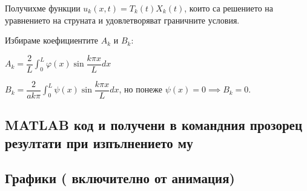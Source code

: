\documentclass[14pt]{extarticle}
\let\frac\dfrac
\begin{document}
Получихме функции $u_k(x,t) = T_k(t)X_k(t)$, които са решението на уравнението на струната и удовлетворяват граничните условия.

Избираме коефициентите $A_k$ и $B_k$:

$\displaystyle A_k = \frac{2}{L} \int_0^L \varphi(x)\sin\frac{k\pi x}{L} dx$

$\displaystyle B_k = \frac{2}{ak\pi} \int_0^L \psi(x)\sin\frac{k\pi x}{L} dx$, но понеже $\psi(x) = 0 \implies B_k = 0$.

\subsection{MATLAB  код и получени в командния прозорец резултати при изпълнението му}

\begin{quote}

\end{quote}

\subsection{Графики ( включително от анимация)}
\end{document}
